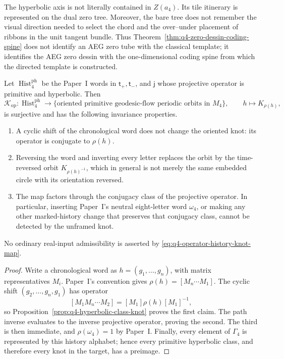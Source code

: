 \begin{warning}
\label{warn:q4-spine-not-template}
The hyperbolic axis is not literally contained in \(Z(a_4)\).  Its tile
itinerary is represented on the dual zero tree.  Moreover, the bare tree does
not remember the visual direction needed to select the chord and the
over--under placement of ribbons in the unit tangent bundle.  Thus
Theorem~\ref{thm:q4-zero-dessin-coding-spine} does not identify an AEG zero tube
with the classical template; it identifies the AEG zero dessin with the
one-dimensional coding spine from which the directed template is constructed.
\end{warning}

\begin{proposition}
\label{prop:q4-operator-history-knot-map}
Let \(\operatorname{Hist}_{4}^{\mathrm{ph}}\) be the Paper~I words in
\(\mathsf t_+,\mathsf t_-\), and \(\mathsf j\) whose projective operator is
primitive and hyperbolic.  Then
\begin{equation}
 \mathcal K_{\mathrm{op}}:
 \operatorname{Hist}_{4}^{\mathrm{ph}}
 \longrightarrow
 \{\text{oriented primitive geodesic-flow periodic orbits in }M_4\},
 \qquad
 h\longmapsto K_{\rho(h)},
 \label{eq:q4-operator-history-knot-map}
\end{equation}
is surjective and has the following invariance properties.
\begin{enumerate}
\item A cyclic shift of the chronological word does not change the oriented
knot: its operator is conjugate to \(\rho(h)\).
\item Reversing the word and inverting every letter replaces the orbit by the
time-reversed orbit \(K_{\rho(h)^{-1}}\), which in general is not merely the
same embedded circle with its orientation reversed.
\item The map factors through the conjugacy class of the projective operator.
In particular, inserting Paper~I's neutral eight-letter word \(\omega_4\), or
making any other marked-history change that preserves that conjugacy class,
cannot be detected by the unframed knot.
\end{enumerate}
No ordinary real-input admissibility is asserted by
\eqref{eq:q4-operator-history-knot-map}.
\end{proposition}

\begin{proof}
Write a chronological word as \(h=(g_1,\ldots,g_n)\), with matrix
representatives \(M_i\).  Paper~I's convention gives
\(\rho(h)=[M_n\cdots M_1]\).  The cyclic shift
\((g_2,\ldots,g_n,g_1)\) has operator
\[
 [M_1M_n\cdots M_2]
 =[M_1]\rho(h)[M_1]^{-1},
\]
so Proposition~\ref{prop:q4-hyperbolic-class-knot} proves the first claim.
The path inverse evaluates to the inverse projective operator, proving the
second.  The third is then immediate, and
\(\rho(\omega_4)=1\) by Paper~I.  Finally, every element of \(\Gamma_4\) is
represented by this history alphabet; hence every primitive hyperbolic class,
and therefore every knot in the target, has a preimage.
\end{proof}

